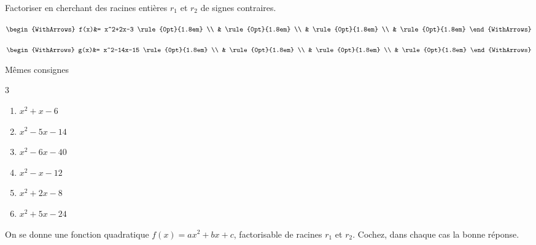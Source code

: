 \documentclass[main.tex]{subfiles}
\begin{document}
\begin{example}[Cas p<0] Factoriser en cherchant des racines entières $r_1$ et $r_2$ de signes contraires.
	
	\noindent\parbox{0.45\linewidth}{	
		$\begin{WithArrows}
			f(x)&= x^2+2x-3 \rule{0pt}{1.8em} \\ 
			& \rule{0pt}{1.8em}  \\  
			&  \rule{0pt}{1.8em}  \\  
			&  \rule{0pt}{1.8em}     
		\end{WithArrows}$
	}   \hfill\parbox{0.48\linewidth}{	
		$\begin{WithArrows}
			g(x)&=  x^2-14x-15  \rule{0pt}{1.8em} \\ 
			& \rule{0pt}{1.8em}  \\  
			&  \rule{0pt}{1.8em}   \\  
			&  \rule{0pt}{1.8em}    
		\end{WithArrows}$
	}  
\end{example}
\begin{exercise}[À vous]\label{chapitre01:exercice:factorisationparessaierreur:niveau02}   Mêmes consignes\vspace{-1em}
	\begin{multicols}{3} 
		\begin{enumerate}[label={$f_\arabic*(x)=$\rule{0pt}{1.8em}}, leftmargin=*] 
			\item $x^2+x-6$
			\item $x^2-5x-14$
			\item $x^2-6x-40$
			\item $x^2-x-12$ 
			\item $x^2+2x-8$
			\item $x^2+5x-24$
		\end{enumerate}
	\end{multicols}
\end{exercise}




\begin{exercise} On se donne une fonction quadratique $f(x)=ax^2+bx+c$, factorisable de racines $r_1$ et $r_2$. Cochez, dans chaque cas la bonne réponse.
	
\end{exercise}
\end{document}
